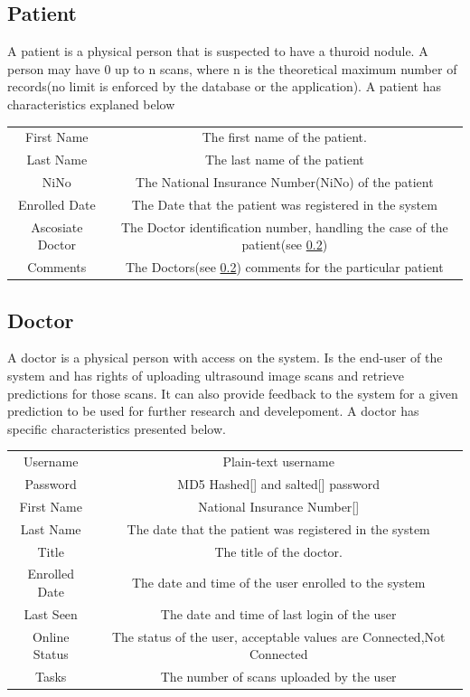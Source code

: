 		\subsection{Patient}
		\label{patient-definition}
		A patient is a physical person that is suspected to have a thuroid nodule. A person may have 0 up to n scans, where n is the theoretical
		maximum number of records(no limit is enforced by the database or the application). A patient has characteristics explaned below
		\begin{center}
			\begin{tabular}{ |c|c| } 
				\hline
				First Name & The first name of the patient.\\
				Last Name & The last name of the patient \\
				NiNo & The National Insurance Number(NiNo) of the patient \\
				Enrolled Date & The Date that the patient was registered in the system \\
				Ascosiate Doctor& The Doctor identification number, handling the case of the patient(see \ref{doctor-definition}) \\
				Comments& The Doctors(see \ref{doctor-definition}) comments for the particular patient\\
				\hline
			\end{tabular}
		\end{center}
		\subsection{Doctor}
		\label{doctor-definition}
		A doctor is a physical person with access on the system. Is the end-user of the system and has rights of uploading ultrasound image
		scans and retrieve predictions for those scans. It can also provide feedback to the system for a given prediction to be used for 
		further research and develepoment. A doctor has specific characteristics presented below.
		\begin{center}
			\begin{tabular}{ |c|c| } 
				\hline
				Username & Plain-text username\\
				Password & MD5 Hashed[\cite{rfc1321}] and salted[\cite{MANBER1996171}] password \\
				First Name & National Insurance Number[\cite{nino-format}] \\
				Last Name & The date that the patient was registered in the system \\
				Title& The title of the doctor.\\
				Enrolled Date& The date and time of the user enrolled to the system\\
				Last Seen& The date and time of last login of the user \\
				Online Status& The status of the user, acceptable values are Connected,Not Connected \\
				Tasks& The number of scans uploaded by the user \\
				\hline
			\end{tabular}
		\end{center}
